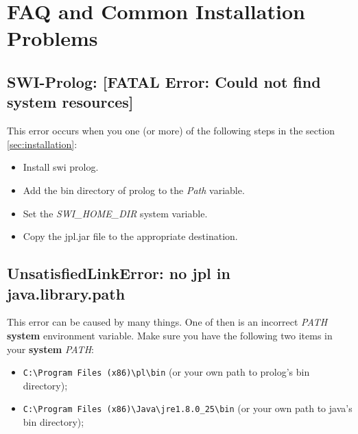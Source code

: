 ﻿\section{FAQ and Common Installation Problems}
\label{sec:faq}

\begin{comment} 

Erro de quando se abre um modelo sem ter executado a transformacao antes. Os
 ficheiros ainda n tao carregados na plataforma\ldots
 
 Solucao: adicionar atributo no modelo (nao viavel). Outra: Correr simplesmente
 a transformacao

Erro de inicializacao de prolog e isso
	Solucao: rever as path variables e copiar o jpl.jar pra lib do java. Verificar
	tbm se a versao usada do java eh a correcta.





\end{comment}

\subsection{SWI-Prolog: [FATAL Error: Could not find system resources]}

This error occurs when you one (or more) of the following steps in the section \ref{sec:installation}:
\begin{itemize}
\item Install swi prolog.
\item Add the bin directory of prolog to the \emph{Path} variable.
\item Set the \emph{SWI\_HOME\_DIR} system variable.
\item Copy the jpl.jar file to the appropriate destination.
\end{itemize}

\subsection{UnsatisfiedLinkError: no jpl in java.library.path}

This error can be caused by many things. One of then is an incorrect \emph{PATH} \textbf{system} environment variable.
Make sure you have the following two items in your \textbf{system} \emph{PATH}:
\begin{itemize}
	\item \verb=C:\Program Files (x86)\pl\bin= (or your own path to prolog's bin
	directory);
	\item \verb=C:\Program Files (x86)\Java\jre1.8.0_25\bin= (or your own path
	to java's bin directory);
\end{itemize}

